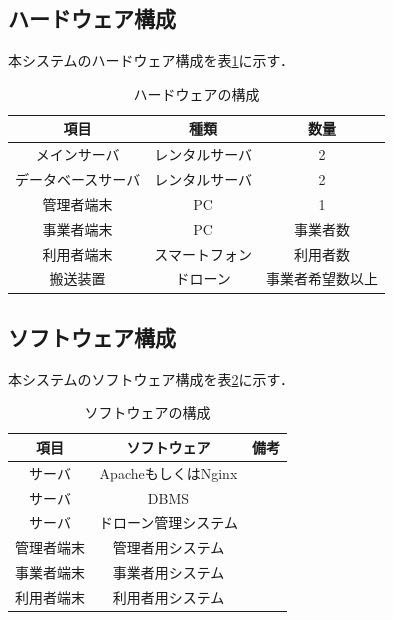 \documentclass[a4paper, titlepage]{jsarticle}
\begin{document}
\subsection{ハードウェア構成}
本システムのハードウェア構成を表\ref{fig:hardware}に示す．
\begin{table}[H]
  \begin{center}
    \caption{ハードウェアの構成}
    \label{fig:hardware}
    \begin{tabular}{ccc} \hline
      項目        & 種類      & 数量       \\ \hline \hline
      メインサーバ    & レンタルサーバ & 2        \\
      データベースサーバ & レンタルサーバ & 2        \\
      管理者端末     & PC      & 1        \\
      事業者端末     & PC      & 事業者数     \\
      利用者端末     & スマートフォン & 利用者数     \\
      搬送装置      & ドローン    & 事業者希望数以上 \\ \hline
    \end{tabular}
  \end{center}
\end{table}
\subsection{ソフトウェア構成}
本システムのソフトウェア構成を表\ref{fig:software}に示す．
\begin{table}[H]
  \begin{center}
    \caption{ソフトウェアの構成}
    \label{fig:software}
    \begin{tabular}{ccc} \hline
      項目    & ソフトウェア          & 備考 \\ \hline \hline
      サーバ   & ApacheもしくはNginx &    \\
      サーバ   & DBMS            &    \\
      サーバ   & ドローン管理システム      &    \\
      管理者端末 & 管理者用システム        &    \\
      事業者端末 & 事業者用システム        &    \\
      利用者端末 & 利用者用システム        &    \\ \hline
    \end{tabular}
  \end{center}
\end{table}
\end{document}

